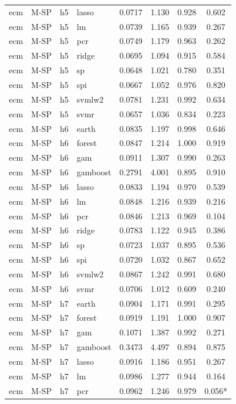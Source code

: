 \begin{ThreePartTable}
\begin{longtable}[t]{llclcccc}
ecm & M-SP & h5 & lasso & 0.0717 & 1.130 & 0.928 & 0.602\\
ecm & M-SP & h5 & lm & 0.0739 & 1.165 & 0.939 & 0.267\\
ecm & M-SP & h5 & pcr & 0.0749 & 1.179 & 0.963 & 0.262\\
ecm & M-SP & h5 & ridge & 0.0695 & 1.094 & 0.915 & 0.584\\
ecm & M-SP & h5 & sp & 0.0648 & 1.021 & 0.780 & 0.351\\
ecm & M-SP & h5 & spi & 0.0667 & 1.052 & 0.976 & 0.820\\
ecm & M-SP & h5 & svmlw2 & 0.0781 & 1.231 & 0.992 & 0.634\\
ecm & M-SP & h5 & svmr & 0.0657 & 1.036 & 0.834 & 0.223\\
\addlinespace
ecm & M-SP & h6 & earth & 0.0835 & 1.197 & 0.998 & 0.646\\
ecm & M-SP & h6 & forest & 0.0847 & 1.214 & 1.000 & 0.919\\
ecm & M-SP & h6 & gam & 0.0911 & 1.307 & 0.990 & 0.263\\
ecm & M-SP & h6 & gamboost & 0.2791 & 4.001 & 0.895 & 0.910\\
ecm & M-SP & h6 & lasso & 0.0833 & 1.194 & 0.970 & 0.539\\
ecm & M-SP & h6 & lm & 0.0848 & 1.216 & 0.939 & 0.216\\
ecm & M-SP & h6 & pcr & 0.0846 & 1.213 & 0.969 & 0.104\\
ecm & M-SP & h6 & ridge & 0.0783 & 1.122 & 0.945 & 0.386\\
ecm & M-SP & h6 & sp & 0.0723 & 1.037 & 0.895 & 0.536\\
ecm & M-SP & h6 & spi & 0.0720 & 1.032 & 0.867 & 0.652\\
ecm & M-SP & h6 & svmlw2 & 0.0867 & 1.242 & 0.991 & 0.680\\
ecm & M-SP & h6 & svmr & 0.0706 & 1.012 & 0.609 & 0.240\\
\addlinespace
ecm & M-SP & h7 & earth & 0.0904 & 1.171 & 0.991 & 0.295\\
ecm & M-SP & h7 & forest & 0.0919 & 1.191 & 1.000 & 0.907\\
ecm & M-SP & h7 & gam & 0.1071 & 1.387 & 0.992 & 0.271\\
ecm & M-SP & h7 & gamboost & 0.3473 & 4.497 & 0.894 & 0.875\\
ecm & M-SP & h7 & lasso & 0.0916 & 1.186 & 0.951 & 0.267\\
ecm & M-SP & h7 & lm & 0.0986 & 1.277 & 0.944 & 0.164\\
ecm & M-SP & h7 & pcr & 0.0962 & 1.246 & 0.979 & 0.056*\\

\end{longtable}
\end{ThreePartTable}

